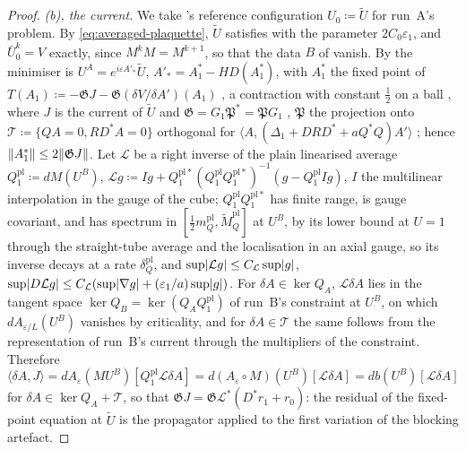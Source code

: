 \documentclass[11pt]{preprint}
\DeclarePairedDelimiter{\abs}{\lvert}{\rvert}
\DeclarePairedDelimiter{\norm}{\lVert}{\rVert}
\numberwithin{equation}{section}
\theoremstyle{definition}
\theoremstyle{remark}
\theoremstyle{plain}
\begin{document}
\begin{proof}
\emph{(b), the current.} We take \cite{BalabanVAR}'s reference configuration $U_0 \coloneqq \tilde U$ for run~A's problem. By \eqref{eq:averaged-plaquette}, $\tilde U$ satisfies \cite[(2)]{BalabanVAR} with the parameter $2C_0\varepsilon_1$, and $\bar U_0^k = V$ exactly, since $M^kM = M^{k+1}$, so that the data $B$ of \cite[(20)]{BalabanVAR} vanish. By \cite[Proposition~5]{BalabanVAR} the minimiser is $U^A = e^{i\varepsilon A'_*}\tilde U$, $A'_* = A_1^* - HD(A_1^*)$, with $A_1^*$ the fixed point of $T(A_1) \coloneqq -\mathfrak GJ - \mathfrak G(\delta V/\delta A')(A_1)$ \cite[(116)]{BalabanVAR}, a contraction with constant $\frac12$ on a ball \cite[(120)--(121)]{BalabanVAR}, where $J$ is the current of $\tilde U$ and $\mathfrak G = G_1\mathfrak P^* = \mathfrak PG_1$ \cite[(3.153)]{BalabanPBG}, $\mathfrak P$ the projection onto $\mathcal T \coloneqq \{QA = 0, RD^*A = 0\}$ orthogonal for $\langle A, (\Delta_1 + DRD^* + aQ^*Q)A'\rangle$ \cite[p.~293]{BalabanVAR}; hence $\norm{A_1^*} \leq 2\norm{\mathfrak GJ}$. Let $\mathcal L$ be a right inverse of the plain linearised average $Q^{\mathrm{pl}}_1 \coloneqq dM(U^B)$, $\mathcal Lg \coloneqq Ig + Q^{\mathrm{pl}*}_1(Q^{\mathrm{pl}}_1Q^{\mathrm{pl}*}_1)^{-1}(g - Q^{\mathrm{pl}}_1Ig)$, $I$ the multilinear interpolation in the gauge of the cube; $Q^{\mathrm{pl}}_1Q^{\mathrm{pl}*}_1$ has finite range, is gauge covariant, and has spectrum in $[\frac12m^{\mathrm{pl}}_Q, \tilde M^{\mathrm{pl}}_Q]$ at $U^B$, by its lower bound at $U = 1$ through the straight-tube average and the localisation in an axial gauge, so its inverse decays at a rate $\delta^{\mathrm{pl}}_Q$, and $\sup\abs{\mathcal Lg} \leq C_{\mathcal L}\sup\abs g$, $\sup\abs{D\mathcal Lg} \leq C_{\mathcal L}(\sup\abs{\nabla g} + (\varepsilon_1/a)\sup\abs g)$. For $\delta A \in \ker Q_A$, $\mathcal L\delta A$ lies in the tangent space $\ker Q_B = \ker(Q_AQ^{\mathrm{pl}}_1)$ of run~B's constraint at $U^B$, on which $dA_{\varepsilon/L}(U^B)$ vanishes by criticality, and for $\delta A \in \mathcal T$ the same follows from the representation of run~B's current through the multipliers of the constraint. Therefore
\begin{equation}\label{eq:current-variation}
    \langle\delta A, J\rangle = dA_\varepsilon(MU^B)[Q^{\mathrm{pl}}_1\mathcal L\delta A] = d(A_\varepsilon \circ M)(U^B)[\mathcal L\delta A] = db(U^B)[\mathcal L\delta A]
\end{equation}
for $\delta A \in \ker Q_A + \mathcal T$, so that $\mathfrak GJ = \mathfrak G\mathcal L^*(D^*r_1 + r_0)$: the residual of the fixed-point equation at $\tilde U$ is the propagator applied to the first variation of the blocking artefact.


\end{proof}
\end{document}

